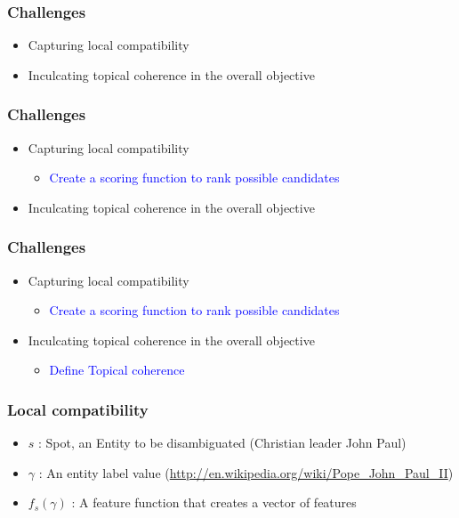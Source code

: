 \documentclass{beamer}
\begin{document}
\begin{frame}
 \frametitle{Challenges}
 \begin{itemize}
  \item Capturing local compatibility
  \item Inculcating topical coherence in the overall objective
 \end{itemize}

\end{frame}

\begin{frame}
 \frametitle{Challenges}
 \begin{itemize}
  \item Capturing local compatibility
  \begin{itemize}
   \item \textcolor{blue}{Create a scoring function to rank possible candidates}
  \end{itemize}

  \item Inculcating topical coherence in the overall objective
 \end{itemize}

\end{frame}


\begin{frame}
 \frametitle{Challenges}
 \begin{itemize}
  \item Capturing local compatibility
  \begin{itemize}
   \item \textcolor{blue}{Create a scoring function to rank possible candidates}
  \end{itemize}

  \item Inculcating topical coherence in the overall objective

  \begin{itemize}
   \item \textcolor{blue}{Define Topical coherence}
  \end{itemize}

  \end{itemize}

\end{frame}

\begin{frame}
 \frametitle{Local compatibility}
 \begin{itemize}
  \item $s$ : Spot, an Entity to be disambiguated (Christian leader John Paul) \bigskip 
  \item $\gamma$ : An entity label value (\url{http://en.wikipedia.org/wiki/Pope_John_Paul_II}) 
 \item $f_s(\gamma)$ : A feature function that creates a vector of features
 \end{itemize}

  
\end{frame}
\end{document}
